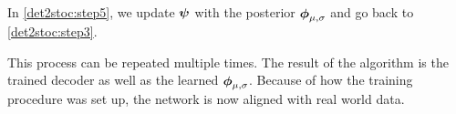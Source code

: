 In \ref{det2stoc:step5}, we update $\boldsymbol{\psi}$ with the posterior $\boldsymbol{\phi}_{\mu,\sigma}$ and go back to \ref{det2stoc:step3}.

This process can be repeated multiple times. The result of the \dettostoc{} algorithm is the trained decoder as well as the learned $\boldsymbol{\phi}_{\mu, \sigma}$. Because of how the training procedure was set up, the network is now aligned with real world data.


